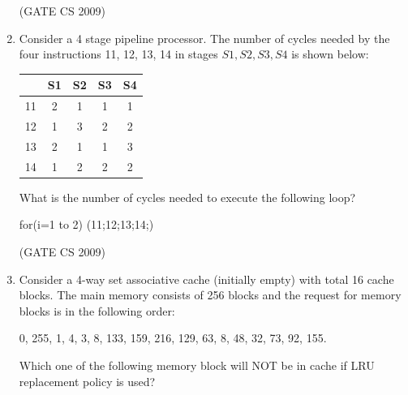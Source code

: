 \documentclass[a4paper, 11pt]{article}
\begin{document}
\begin{enumerate}
        \hfill (GATE CS 2009)

    \item Consider a 4 stage pipeline processor. The number of cycles needed by the four instructions 11, 12, 13, 14 in stages $S1, S2, S3, S4$ is shown below:\\
    \begin{center}
        \begin{tabular}{|c|c|c|c|c|}
    \hline
           & S1  & S2 & S3 & S4 \\
        \hline
        11  & 2  & 1 & 1 & 1 \\
        \hline
        12  & 1  & 3 & 2 & 2 \\
        \hline
        13  & 2  & 1 & 1 & 3 \\
        \hline
        14  & 1  & 2 & 2 & 2 \\
        \hline
    \end{tabular}
    \end{center}
    

    What is the number of cycles needed to execute the following loop?\\
        \begin{center}
            for(i=1 to 2) (11;12;13;14;)\\
        \end{center}
        \begin{enumerate}
        \end{enumerate}

    \hfill (GATE CS 2009)

    \item Consider a 4-way set associative cache (initially empty) with total 16 cache blocks. The main memory consists of 256 blocks and the request for memory blocks is in the following order:
    
    \begin{center}
        0, 255, 1, 4, 3, 8, 133, 159, 216, 129, 63, 8, 48, 32, 73, 92, 155.\\
    \end{center}
    
    Which one of the following memory block will NOT be in cache if LRU replacement policy is used?
        \begin{enumerate}
        \end{enumerate}


\end{enumerate}
\end{document}
